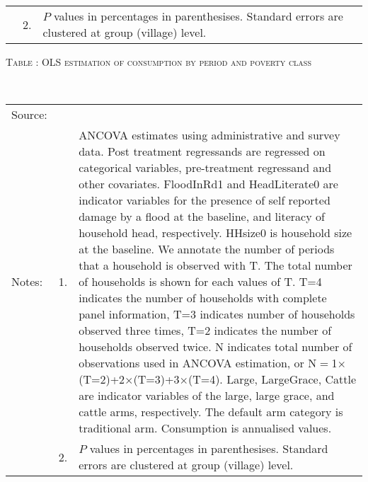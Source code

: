 \begin{minipage}[t]{14cm}
\begin{tabular}{>{\hfill\scriptsize}p{1cm}<{}>{\hfill\scriptsize}p{.25cm}<{}>{\scriptsize}p{12cm}<{\hfill}}
& 2. & $P$ values in percentages in parenthesises. Standard errors are clustered at group (village) level.
\end{tabular}
\end{minipage}


\hspace{-1cm}\begin{minipage}[t]{14cm}
\hfil\textsc{\normalsize Table \thetable: OLS estimation of consumption by period and poverty class\label{tab ConsumptionOLSTimeVaryingPovertyStatusANCOVA}}\\
\setlength{\tabcolsep}{1pt}
\setlength{\baselineskip}{8pt}
\renewcommand{\arraystretch}{.55}
\hfil{}\\
\renewcommand{\arraystretch}{.8}
\setlength{\tabcolsep}{1pt}
\begin{tabular}{>{\hfill\scriptsize}p{1cm}<{}>{\hfill\scriptsize}p{.25cm}<{}>{\scriptsize}p{12cm}<{\hfill}}
Source:& \multicolumn{2}{l}{\scriptsize Estimated with GUK administrative and survey data.}\\
Notes: & 1. & ANCOVA estimates using administrative and survey data. Post treatment regressands are regressed on categorical variables, pre-treatment regressand and other covariates. \textsf{FloodInRd1} and \textsf{HeadLiterate0} are indicator variables for the presence of self reported damage by a flood at the baseline, and literacy of household head, respectively. \textsf{HHsize0} is household size at the baseline. We annotate the number of periods that a household is observed with \textsf{T}. The total number of households is shown for each values of \textsf{T}. \textsf{T=4} indicates the number of households with complete panel information, \textsf{T=3} indicates number of households observed three times, \textsf{T=2} indicates the number of households observed twice. \textsf{N} indicates total number of observations used in ANCOVA estimation, or \textsf{N$=$1$\times$(T=2)+2$\times$(T=3)+3$\times$(T=4)}.  \textsf{Large}, \textsf{LargeGrace}, \textsf{Cattle} are indicator variables of the \textsf{large}, \textsf{large grace}, and \textsf{cattle} arms, respectively. The default arm category is \textsf{traditional} arm. Consumption is annualised values. \\
& 2. & $P$ values in percentages in parenthesises. Standard errors are clustered at group (village) level.
\end{tabular}
\end{minipage}


